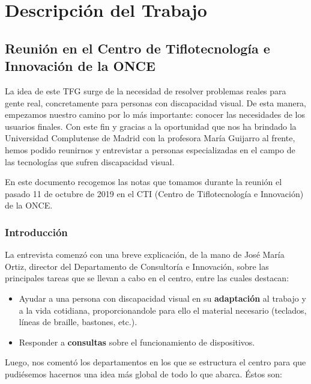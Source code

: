 \chapter{Descripción del Trabajo}
\label{cap:descripcionTrabajo}


\section{Reunión en el Centro de Tiflotecnología e Innovación de la ONCE}

La idea de este TFG surge de la necesidad de resolver problemas reales para gente real, concretamente para personas con discapacidad visual. De esta manera, empezamos nuestro camino por lo más importante: conocer las necesidades de los usuarios finales. Con este fin y gracias a la oportunidad que nos ha brindado la Universidad Complutense de Madrid con la profesora María Guijarro al frente, hemos podido reunirnos y entrevistar a personas especializadas en el campo de las tecnologías que sufren discapacidad visual.

En este documento recogemos las notas que tomamos durante la reunión el pasado 11 de octubre de 2019 en el CTI (Centro de Tiflotecnología e Innovación) de la ONCE.
	

\subsection{Introducción}
La entrevista comenzó con una breve explicación, de la mano de José María Ortiz, director del Departamento de Consultoría e Innovación, sobre las principales tareas que se llevan a cabo en el centro, entre las cuales destacan:

\begin{itemize}
	\item Ayudar a una persona con discapacidad visual en su \textbf{adaptación} al trabajo y a la vida cotidiana, proporcionandole para ello el material necesario (teclados, líneas de braille, bastones, etc.).
	\item Responder a \textbf{consultas} sobre el funcionamiento de dispositivos.
\end{itemize}

Luego, nos comentó los departamentos en los que se estructura el centro para que pudiésemos hacernos una idea más global de todo lo que abarca. Éstos son:

